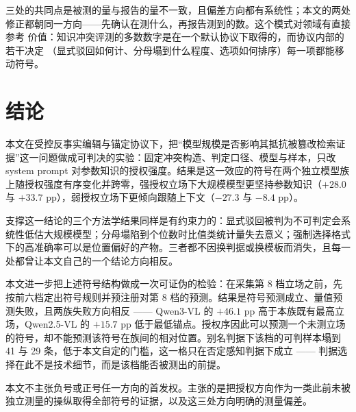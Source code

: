 \documentclass[10.5pt,compsoc,UTF8]{CjC}
\theoremstyle{mystyle}
\begin{document}
三处的共同点是被测的量与报告的量不一致，且偏差方向都有系统性；本文的两处
修正都朝同一方向——先确认在测什么，再报告测到的数。这个模式对领域有直接参考
价值：知识冲突评测的多数数字是在一个默认协议下取得的，而协议内部的若干决定
（显式驳回如何计、分母塌到什么程度、选项如何排序）每一项都能移动符号。

\section{结论}\label{sec:conc}

本文在受控反事实编辑与锚定协议下，把“模型规模是否影响其抵抗被篡改检索证据”这一问题做成可判决的实验：固定冲突构造、判定口径、模型与样本，只改 system prompt 对参数知识的授权强度。结果是这一效应的符号在两个独立模型族上随授权强度有序变化并跨零，强授权立场下大规模模型更坚持参数知识（$+28.0$ 与 $+33.7$ pp），弱授权立场下更倾向跟随上下文（$-27.3$ 与 $-8.4$ pp）。

支撑这一结论的三个方法学结果同样是有约束力的：显式驳回被判为不可判定会系统性低估大规模模型；分母塌陷到个位数时比值类统计量失去意义；强制选择格式下的高准确率可以是位置偏好的产物。三者都不因换判据或换模板而消失，且每一处都曾让本文自己的一个结论方向相反。

本文进一步把上述符号结构做成一次可证伪的检验：在采集第 8 档立场之前，先按前六档定出符号规则并预注册对第 8 档的预测。结果是符号预测成立、量值预测失败，且两族失败方向相反 —— Qwen3-VL 的 $+46.1$ pp 高于本族既有最高立场，Qwen2.5-VL 的 $+15.7$ pp 低于最低锚点。授权序因此可以预测一个未测立场的符号，却不能预测该符号在族间的相对位置。别名判据下该档的可判样本塌到 41 与 29 条，低于本文自定的门槛，这一格只在否定感知判据下成立 —— 判据选择在此不是技术细节，而是该档能否被测出的前提。

本文不主张负号或正号任一方向的首发权。主张的是把授权方向作为一类此前未被独立测量的操纵取得全部符号的证据，以及这三处方向明确的测量偏差。
\end{document}
